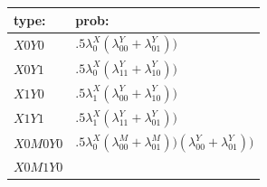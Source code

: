 \documentclass[
  12pt,
]{book}
\begin{document}
\begin{longtable}[]{@{}ll@{}}
\toprule
\begin{minipage}[b]{0.11\columnwidth}\raggedright
type:\strut
\end{minipage} & \begin{minipage}[b]{0.84\columnwidth}\raggedright
prob:\strut
\end{minipage}\tabularnewline
\midrule
\endhead
\begin{minipage}[t]{0.11\columnwidth}\raggedright
\(X0Y0\)\strut
\end{minipage} & \begin{minipage}[t]{0.84\columnwidth}\raggedright
\(.5\lambda^X_0(\lambda^Y_{00}+\lambda^Y_{01}))\)\strut
\end{minipage}\tabularnewline
\begin{minipage}[t]{0.11\columnwidth}\raggedright
\(X0Y1\)\strut
\end{minipage} & \begin{minipage}[t]{0.84\columnwidth}\raggedright
\(.5\lambda^X_0(\lambda^Y_{11}+\lambda^Y_{10}))\)\strut
\end{minipage}\tabularnewline
\begin{minipage}[t]{0.11\columnwidth}\raggedright
\(X1Y0\)\strut
\end{minipage} & \begin{minipage}[t]{0.84\columnwidth}\raggedright
\(.5\lambda^X_1(\lambda^Y_{00}+\lambda^Y_{10}))\)\strut
\end{minipage}\tabularnewline
\begin{minipage}[t]{0.11\columnwidth}\raggedright
\(X1Y1\)\strut
\end{minipage} & \begin{minipage}[t]{0.84\columnwidth}\raggedright
\(.5\lambda^X_1(\lambda^Y_{11}+\lambda^Y_{01}))\)\strut
\end{minipage}\tabularnewline
\begin{minipage}[t]{0.11\columnwidth}\raggedright
\(X0M0Y0\)\strut
\end{minipage} & \begin{minipage}[t]{0.84\columnwidth}\raggedright
\(.5\lambda^X_0(\lambda^M_{00}+\lambda^M_{01}))(\lambda^Y_{00}+\lambda^Y_{01}))\)\strut
\end{minipage}\tabularnewline
\begin{minipage}[t]{0.11\columnwidth}\raggedright
\(X0M1Y0\)\strut
\end{minipage} & \begin{minipage}[t]{0.84\columnwidth}\raggedright

\end{minipage}
\end{longtable}
\end{document}
